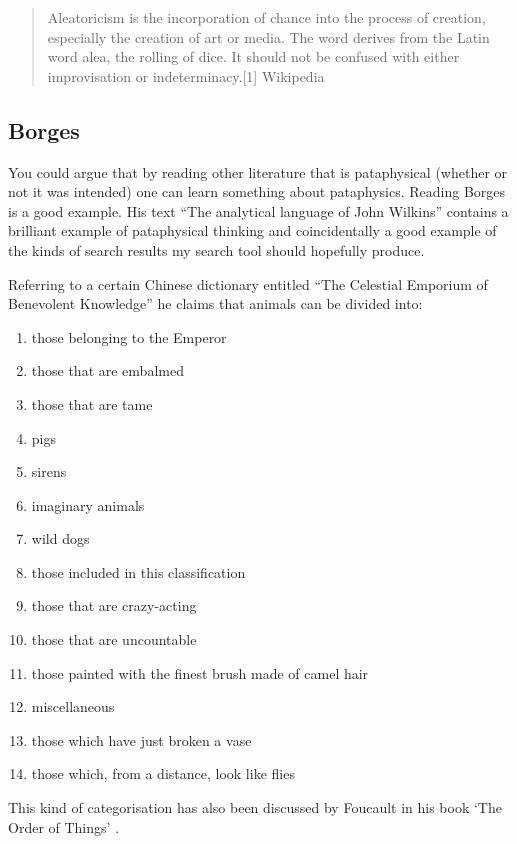 \begin{quote}
  Aleatoricism is the incorporation of chance into the process of creation, especially the creation of art or media. The word derives from the Latin word alea, the rolling of dice. It should not be confused with either improvisation or indeterminacy.[1] Wikipedia
\end{quote}


\subsection{Borges}

You could argue that by reading other literature that is pataphysical (whether or not it was intended) one can learn something about pataphysics. Reading Borges \citep{Borges1964, Borges1999, Borges1957, Borges2010a, Borges2010b, Borges2000} is a good example. His text ``The analytical language of John Wilkins'' \citep{Borges2000} contains a brilliant example of pataphysical thinking and coincidentally a good example of the kinds of search results my search tool should hopefully produce.

Referring to a certain Chinese dictionary entitled ``The Celestial Emporium of Benevolent Knowledge'' he claims that animals can be divided into:

\begin{enumerate}
  \item	those belonging to the Emperor
  \item	those that are embalmed
  \item	those that are tame
  \item	pigs
  \item	sirens
  \item	imaginary animals
  \item	wild dogs
  \item	those included in this classification
  \item	those that are crazy-acting
  \item	those that are uncountable
  \item	those painted with the finest brush made of camel hair
  \item	miscellaneous
  \item	those which have just broken a vase
  \item	those which, from a distance, look like flies
\end{enumerate}

This kind of categorisation has also been discussed by Foucault in his book `The Order of Things' \citep{Foucault1966}.

